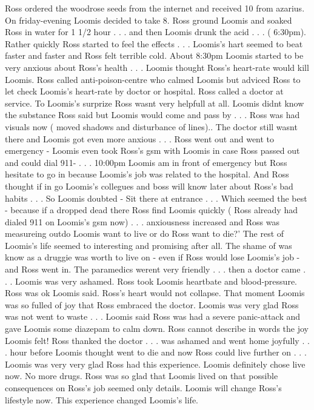 \documentclass[12pt]{book}
\begin{document}
Ross ordered the woodrose seeds from the internet and received 10 from azarius. On friday-evening Loomis decided to take 8. Ross ground Loomis and soaked Ross in water for 1 1/2 hour . . .  and then Loomis drunk the acid . . .  ( 6:30pm). Rather quickly Ross started to feel the effects . . .  Loomis's hart seemed to beat faster and faster and Ross felt terrible cold. About 8:30pm Loomis started to be very anxious about Ross's health . . .  Loomis thought Ross's heart-rate would kill Loomis. Ross called anti-poison-centre who calmed Loomis but adviced Ross to let check Loomis's heart-rate by doctor or hospital. Ross called a doctor at service. To Loomis's surprize Ross wasnt very helpfull at all. Loomis didnt know the substance Ross said but Loomis would come and pass by . . .  Ross was had visuals now ( moved shadows and disturbance of lines).. The doctor still wasnt there and Loomis got even more anxious . . .  Ross went out and went to emergency - Loomis even took Ross's gsm with Loomis in case Ross passed out and could dial 911-  . . .  10:00pm Loomis am in front of emergency but Ross hesitate to go in because Loomis's job was related to the hospital. And Ross thought if in go Loomis's collegues and boss will know later about Ross's bad habits  . . .  So Loomis doubted - Sit there at entrance  . . .  Which seemed the best - because if a dropped dead there Ross find Loomis quickly ( Ross already had dialed 911 on Loomis's gsm now) . . .  anxiousness increased and Ross was measureing outdo Loomis want to live or do Ross want to die?' The rest of Loomis's life seemed to interesting and promising after all. The shame of was know as a druggie was worth to live on - even if Ross would lose Loomis's job - and Ross went in. The paramedics werent very friendly . . .  then a doctor came . . .  Loomis was very ashamed. Ross took Loomis heartbate and blood-pressure. Ross was ok Loomis said. Ross's heart would not collapse. That moment Loomis was so fulled of joy that Ross embraced the doctor. Loomis was very glad Ross was not went to waste . . .  Loomis said Ross was had a severe panic-attack and gave Loomis some diazepam to calm down. Ross cannot describe in words the joy Loomis felt! Ross thanked the doctor . . .  was ashamed and went home joyfully . . .  hour before Loomis thought went to die and now Ross could live further on . . .  Loomis was very very glad Ross had this experience. Loomis definitely chose live now. No more drugs. Ross was so glad that Loomis lived on that possible consequences on Ross's job seemed only details. Loomis will change Ross's lifestyle now. This experience changed Loomis's life.
\end{document}
